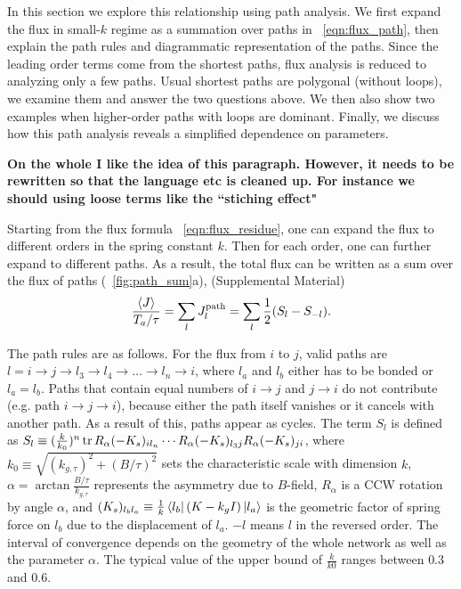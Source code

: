 \documentclass[
 preprint,
 preprintnumbers,
 amsmath,amssymb,
 aps,
 pre,
 longbibliography,
 10pt, twocolumn
]{revtex4-1}
\begin{document}
In this section we explore this relationship using path analysis.
We first expand the flux in small-$k$ regime as a summation over paths in \eqnname~\eqref{eqn:flux_path}, then explain the path rules and diagrammatic representation of the paths.
Since the leading order terms come from the shortest paths, flux analysis is reduced to analyzing only a few paths.
Usual shortest paths are polygonal (without loops), we examine them and answer the two questions above. 
We then also show two examples when higher-order paths with loops are dominant.
Finally, we discuss how this path analysis reveals a simplified dependence on parameters.

{\bf On the whole I like the idea of this paragraph. However, it needs to be rewritten so that the language etc is cleaned up. For instance we should using loose terms like the  ``stiching effect" }

Starting from the flux formula \eqnname~\eqref{eqn:flux_residue}, one can expand the flux to different orders in the spring constant $k$. Then for each order, one can further expand to different paths.
As a result, the total flux can be written as a sum over the flux of paths (\figurename~\ref{fig:path_sum}a), (Supplemental Material)
\begin{equation} \label{eqn:flux_path}
\frac{\expval{J}}{T_a/\tau} = \sum_l J^\text{path}_l = \sum_l \frac{1}{2}(S_l - S_{-l}).
\end{equation}

The path rules are as follows.
For the flux from $i$ to $j$, valid paths are $l=i\rightarrow j\rightarrow l_3\rightarrow l_4\rightarrow \dots \rightarrow l_n\rightarrow i$, where $l_a$ and $l_b$ either has to be bonded or $l_a=l_b$. Paths that contain equal numbers of $i\rightarrow j$ and $j\rightarrow i$ do not contribute (e.g. path $i\rightarrow j\rightarrow i$), because either the path itself vanishes or it cancels with another path. As a result of this, paths appear as cycles.
The term $S_l$ is defined as $S_l \equiv (\frac{k}{k_0})^n \tr R_\alpha (-K_s)_{i l_n} \cdots R_\alpha (-K_s)_{l_3j} R_\alpha (-K_s)_{ji}$,
where $k_0\equiv \sqrt{(k_{g,\tau})^2 + (B/\tau)^2}$ sets the characteristic scale with dimension $k$, $\alpha = \arctan{\frac{B/\tau}{k_{g,\tau}}}$ represents the asymmetry due to $B$-field, $R_\alpha$ is a CCW rotation by angle $\alpha$, and $(K_s)_{l_b l_a} \equiv \frac{1}{k}\bra{l_b}(K-k_gI)\ket{l_a}$ is the geometric factor of spring force on $l_b$ due to the displacement of $l_a$.
$-l$ means $l$ in the reversed order.
The interval of convergence depends on the geometry of the whole network as well as the parameter $\alpha$. The typical value of the upper bound of $\frac{k}{k0}$ ranges between $0.3$ and $0.6$.
\end{document}
